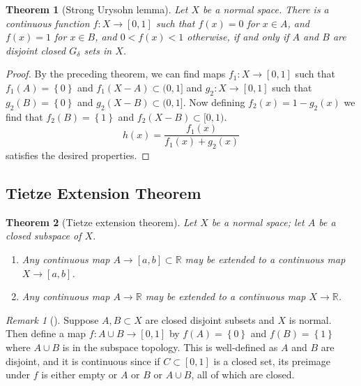 \documentclass[reqno]{amsart}
\theoremstyle{plain}%
\newtheorem{theorem}{Theorem}[section]
\theoremstyle{definition}
\theoremstyle{remark}
\newtheorem*{remark}{Remark}
\begin{document}
\begin{theorem}[Strong Urysohn lemma]
    Let $X$ be a normal space. There is a continuous function $f  \colon X \to 
    \left[ 0,1 \right] $ such that $f(x) = 0$ for $x \in A$, and
    $f(x) = 1$ for $x \in B$, and $0 < f(x) < 1$ otherwise, if and only if
    $A$ and $B$ are disjoint closed $G_{\delta}$ sets in $X$.
\end{theorem}

\begin{proof}
    By the preceding theorem, we can find maps
    $f_1  \colon X \to \left[ 0,1 \right] $ such that
    $f_1 (A) = \left\{ 0 \right\} $ and
    $f_1 \left( X-A \right) \subset (0,1]$ and
    $g_2  \colon X \to \left[ 0,1 \right] $ such that
    $g_2 (B) = \left\{ 0 \right\} $ and
    $g_2 \left( X-B \right)  \subset (0,1]$. Now defining
    $f_2 (x) = 1-g_2(x)$ we find that
    $f_2 (B) = \left\{ 1 \right\} $ and
    $f_2 \left( X-B \right) \subset [0,1)$.
    \[
    h(x) = \frac{f_1(x)}{f_1(x) + g_2(x)}
    \] 
    satisfies the desired properties.
\end{proof}


\subsection{Tietze Extension Theorem}

\begin{theorem}[Tietze extension theorem]
    Let $X$ be a normal space; let $A$ be a closed subspace of $X$.
    \begin{enumerate}
        \item Any continuous map $A \to \left[ a,b \right] \subset \mathbb{R}$ 
            may be extended to a continuous map
            $X \to \left[ a,b \right] $.
        \item Any continuous map $A \to \mathbb{R}$ may be extended
            to a continuous map $X \to \mathbb{R}$.
    \end{enumerate}
\end{theorem}

\begin{remark}[]
    Suppose $A,B \subset X$ are closed disjoint subsets and $X$ is normal. Then
    define a map $f  \colon A \cup B \to \left[ 0,1 \right] $ by
    $f(A) = \left\{ 0 \right\} $ and $f(B) = \left\{ 1 \right\} $ where
    $A \cup B$ is in the subspace topology. This is well-defined as
    $A$ and $B$ are disjoint, and it is continuous since if
    $C \subset \left[ 0,1 \right] $ is a closed set, its preimage under
    $f$ is either empty or $A$ or $B$ or $A \cup B$, all of which are closed.
\end{remark}
\end{document}
